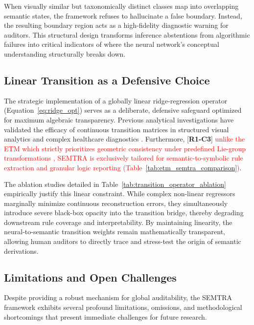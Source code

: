\documentclass[make,article,submit,pdftex,moreauthors]{Definitions/mdpi}
\newcommand{\revtag}[2]{[\textbf{R#1-C#2}]}
\newcommand{\Rone}[1]{\textcolor{red}{#1}}
\begin{document}
When visually similar but taxonomically distinct classes map into overlapping semantic states, the framework refuses to hallucinate a false boundary. Instead, the resulting boundary region acts as a high-fidelity diagnostic warning for auditors. This structural design transforms inference abstentions from algorithmic failures into critical indicators of where the neural network's conceptual understanding structurally breaks down.

\subsection{Linear Transition as a Defensive Choice}
\label{subsec:linear_transition}

The strategic implementation of a globally linear ridge-regression operator (Equation~\eqref{eq:ridge_opt}) serves as a deliberate, defensive safeguard optimized for maximum algebraic transparency. Previous analytical investigations have validated the efficacy of continuous transition matrices in structured visual analytics \cite{Radiuk2024TransitionMatrix} and complex healthcare diagnostics \cite{Barmak2024TowardTransition}. Furthermore, \revtag{1}{3} \Rone{unlike the ETM which strictly prioritizes geometric consistency under predefined Lie-group transformations \cite{Radiuk2026EquivariantTransition}, SEMTRA is exclusively tailored for semantic-to-symbolic rule extraction and granular logic reporting (Table~\ref{tab:etm_semtra_comparison})}.

The ablation studies detailed in Table~\ref{tab:transition_operator_ablation} empirically justify this linear constraint. While complex non-linear regressors marginally minimize continuous reconstruction errors, they simultaneously introduce severe black-box opacity into the transition bridge, thereby degrading downstream rule coverage and interpretability. By maintaining linearity, the neural-to-semantic transition weights remain mathematically transparent, allowing human auditors to directly trace and stress-test the origin of semantic derivations.

\subsection{Limitations and Open Challenges}
\label{subsec:limitations_directions}

Despite providing a robust mechanism for global auditability, the SEMTRA framework exhibits several profound limitations, omissions, and methodological shortcomings that present immediate challenges for future research.
\end{document}
